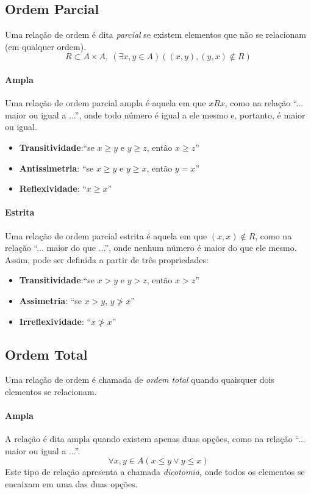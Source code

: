 \subsection{Ordem Parcial}
Uma relação de ordem é dita \emph{parcial} se existem elementos que não se relacionam (em qualquer ordem).
\[R \subset A \times A , \ \left(\exists x,y \in A \right)\left( (x,y), (y,x) \not \in R \right)\]

\paragraph*{Ampla}
Uma relação de ordem parcial ampla é aquela em que $x R x$, como na relação ``... maior ou igual a ...'', onde todo número é igual a ele mesmo e, portanto, é maior ou igual.
\begin{itemize}
\item \textbf{Transitividade}:``se $x\ge y$ e $y\ge z$, então $x\ge z$''
\item \textbf{Antissimetria}: ``se $x\ge y$ e $y \ge x$, então $y =x$''
\item \textbf{Reflexividade}: ``$x \ge x$''
\end{itemize}

\paragraph*{Estrita}
Uma relação de ordem parcial estrita é aquela em que $(x,x) \not \in R$, como na relação ``... maior do que ...'', onde nenhum número é maior do que ele mesmo.
Assim, pode ser definida a partir de três propriedades:
\begin{itemize}
\item \textbf{Transitividade}:``se $x>y$ e $y>z$, então $x>z$''
\item \textbf{Assimetria}: ``se $x>y$, $y\not > x$''
\item \textbf{Irreflexividade}: ``$x \not > x$''
\end{itemize}

\subsection{Ordem Total}
Uma relação de ordem é chamada de \emph{ordem total} quando quaisquer dois elementos se relacionam. 
\paragraph*{Ampla}
A relação é dita ampla quando existem apenas duas opções, como na relação ``... maior ou igual a ...''.
\[\forall x,y \in A \left( x \le y \vee y \le x \right)\]
Este tipo de relação apresenta a chamada \emph{dicotomia}, onde todos os elementos se encaixam em uma das duas opções.

